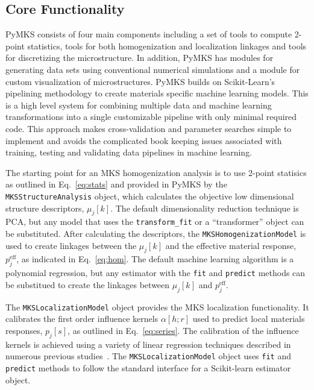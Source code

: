 \documentclass{bmcart}
\begin{document}
\subsection{Core Functionality}


PyMKS consists of four main components including a set of tools to
compute 2-point statistics, tools for both homogenization and
localization linkages and tools for discretizing the microstructure. In
addition, PyMKS has modules for generating data sets using
conventional numerical simulations and a module for custom
visualization of microstructures. PyMKS builds on Scikit-Learn's
pipelining methodology to create materials specific machine learning
models. This is a high level system for combining
multiple data and machine learning transformations into a single
customizable pipeline with only minimal required code. This approach
makes cross-validation and parameter searches simple to implement and
avoids the complicated book keeping issues associated with training,
testing and validating data pipelines in machine learning.

The starting point for an MKS homogenization analysis is to use
2-point statisics as outlined in Eq.~\ref{eq:stats} and provided in
PyMKS by the \texttt{MKSStructureAnalysis} object, which calculates
the objective low dimensional structure descriptors, $\mu_j[k]$. The
default dimensionality reduction technique is PCA, but any model that
uses the \texttt{transform\_fit} or a ``transformer'' object can be
substituted. After calculating the descriptors, the
\texttt{MKSHomogenizationModel} is used to create linkages between the
$\mu_j[k]$ and the effective material response, $p_j^{\text{eff}}$,
as indicated in Eq.~\ref{eq:hom}. The default machine learning
algorithm is a polynomial regression, but any estimator with the
\texttt{fit} and \texttt{predict} methods can be substitued to create
the linkages between $\mu_j[k]$ and $p_j^{\text{eff}}$.

The \texttt{MKSLocalizationModel} object provides the MKS localization
functionality. It calibrates the first order influence kernels
$\alpha[h; r]$ used to predict local materials responses, $p_j[s]$, as
outlined in Eq.~\ref{eq:series}. The calibration of the influence
kernels is achieved using a variety of linear regression techniques
described in numerous previous studies~\cite{landi2010multi,
kalidindi2010novel, yabansu2014calibrated, brough2016microstructure}.
The \texttt{MKSLocalizationModel} object uses \texttt{fit} and
\texttt{predict} methods to follow the standard interface for a
Scikit-learn estimator object.
\end{document}
